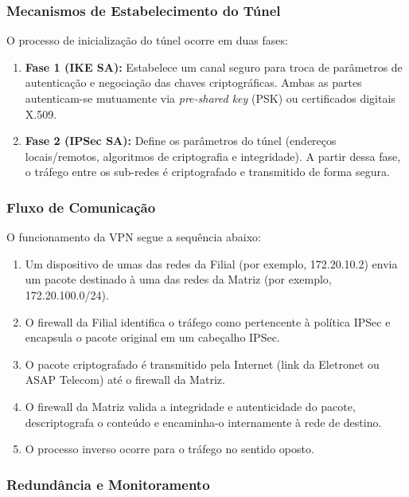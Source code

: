 \documentclass[a4paper, 12pt]{article}
\begin{document}
\subsubsection{Mecanismos de Estabelecimento do Túnel}
\label{subsubsec:vpn-handshake}

O processo de inicialização do túnel ocorre em duas fases:
\begin{enumerate}
    \item \textbf{Fase 1 (IKE SA):} Estabelece um canal seguro para troca de parâmetros de autenticação e negociação das chaves criptográficas. Ambas as partes autenticam-se mutuamente via \textit{pre-shared key} (PSK) ou certificados digitais X.509.
    \item \textbf{Fase 2 (IPSec SA):} Define os parâmetros do túnel (endereços locais/remotos, algoritmos de criptografia e integridade). A partir dessa fase, o tráfego entre os sub-redes é criptografado e transmitido de forma segura.
\end{enumerate}

\subsubsection{Fluxo de Comunicação}
\label{subsubsec:vpn-flow}

O funcionamento da VPN segue a sequência abaixo:
\begin{enumerate}
    \item Um dispositivo de umas das redes da Filial (por exemplo, 172.20.10.2) envia um pacote destinado à uma das redes da Matriz (por exemplo, 172.20.100.0/24).
    \item O firewall da Filial identifica o tráfego como pertencente à política IPSec e encapsula o pacote original em um cabeçalho IPSec.
    \item O pacote criptografado é transmitido pela Internet (link da Eletronet ou ASAP Telecom) até o firewall da Matriz.
    \item O firewall da Matriz valida a integridade e autenticidade do pacote, descriptografa o conteúdo e encaminha-o internamente à rede de destino.
    \item O processo inverso ocorre para o tráfego no sentido oposto.
\end{enumerate}

\subsubsection{Redundância e Monitoramento}
\label{subsubsec:vpn-redundancy}
\end{document}
